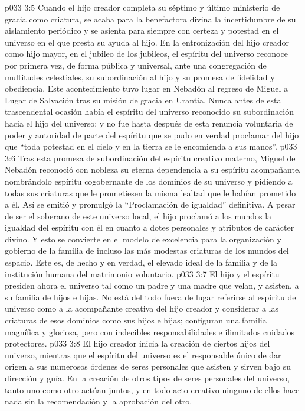 \vs p033 3:5 Cuando el hijo creador completa su séptimo y último ministerio de gracia como criatura, se acaba para la benefactora divina la incertidumbre de su aislamiento periódico y se asienta para siempre con certeza y potestad en el universo en el que presta su ayuda al hijo. En la entronización del hijo creador como hijo mayor, en el jubileo de los jubileos, el espíritu del universo reconoce por primera vez, de forma pública y universal, ante una congregación de multitudes celestiales, su subordinación al hijo y su promesa de fidelidad y obediencia. Este acontecimiento tuvo lugar en Nebadón al regreso de Miguel a Lugar de Salvación tras su misión de gracia en Urantia. Nunca antes de esta trascendental ocasión había el espíritu del universo reconocido su subordinación hacia el hijo del universo; y no fue hasta después de esta renuncia voluntaria de poder y autoridad de parte del espíritu que se pudo en verdad proclamar del hijo que “toda potestad en el cielo y en la tierra se le encomienda a sus manos”.
\vs p033 3:6 Tras esta promesa de subordinación del espíritu creativo materno, Miguel de Nebadón reconoció con nobleza su eterna dependencia a su espíritu acompañante, nombrándolo espíritu cogobernante de los dominios de su universo y pidiendo a todas sus criaturas que le prometiesen la misma lealtad que le habían prometido a él. Así se emitió y promulgó la “Proclamación de igualdad” definitiva. A pesar de ser el soberano de este universo local, el hijo proclamó a los mundos la igualdad del espíritu con él en cuanto a dotes personales y atributos de carácter divino. Y esto se convierte en el modelo de excelencia para la organización y gobierno de la familia de incluso las más modestas criaturas de los mundos del espacio. Este es, de hecho y en verdad, el elevado ideal de la familia y de la institución humana del matrimonio voluntario.
\vs p033 3:7 El hijo y el espíritu presiden ahora el universo tal como un padre y una madre que velan, y asisten, a su familia de hijos e hijas. No está del todo fuera de lugar referirse al espíritu del universo como a la acompañante creativa del hijo creador y considerar a las criaturas de esos dominios como sus hijos e hijas; configuran una familia magnífica y gloriosa, pero con indecibles responsabilidades e ilimitados cuidados protectores.
\vs p033 3:8 \pc El hijo creador inicia la creación de ciertos hijos del universo, mientras que el espíritu del universo es el responsable único de dar origen a sus numerosos órdenes de seres personales que asisten y sirven bajo su dirección y guía. En la creación de otros tipos de seres personales del universo, tanto uno como otro actúan juntos, y en todo acto creativo ninguno de ellos hace nada sin la recomendación y la aprobación del otro.
